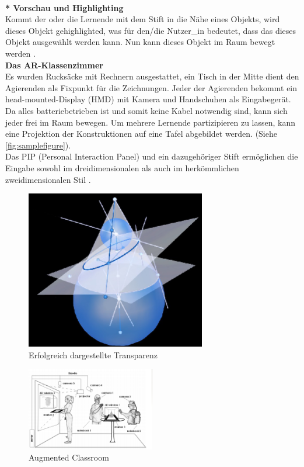 \documentclass[deutsch]{llncs}
\begin{document}
\noindent \\
\textbf{* Vorschau und Highlighting} \\
Kommt der oder die Lernende mit dem Stift in die Nähe eines Objekts, wird dieses Objekt gehighlighted, was für den/die Nutzer\_in bedeutet, dass das dieses Objekt ausgewählt werden kann. Nun kann dieses Objekt im Raum bewegt werden \cite{1667626}.  \\
\textbf{Das AR-Klassenzimmer} \\
Es wurden Rucksäcke mit Rechnern ausgestattet, ein Tisch in der Mitte dient den Agierenden als Fixpunkt für die Zeichnungen. Jeder der Agierenden bekommt ein head-mounted-Display (HMD) mit Kamera und Handschuhen als Eingabegerät. Da alles batteriebetrieben ist und somit keine Kabel notwendig sind, kann sich jeder frei im Raum bewegen. 
Um mehrere Lernende partizipieren zu lassen, kann eine Projektion der Konstruktionen auf eine Tafel abgebildet werden. (Siehe \autoref{fig:samplefigure}). \\
Das PIP (Personal Interaction Panel) und ein dazugehöriger Stift ermöglichen die Eingabe sowohl im dreidimensionalen als auch im herkömmlichen zweidimensionalen Stil \cite{1667626}. 
\begin{figure}[h]
	\centering
	\includegraphics[width=0.7\textwidth]{figures/transparency}
	\caption{Erfolgreich dargestellte Transparenz}
	\label{fig:transparency}
\end{figure}


\begin{figure}[h]
	\centering
	\includegraphics[width=0.5\textwidth]{figures/classroom}
	\caption{Augmented Classroom}
	\label{fig:samplefigure}
\end{figure}
\end{document}

